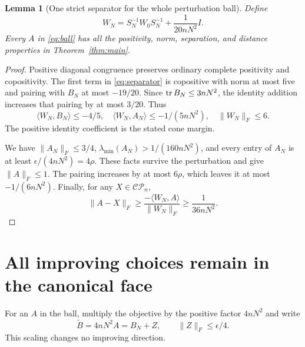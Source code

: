 \documentclass[11pt]{article}
\newtheorem{lemma}[theorem]{Lemma}
\theoremstyle{remark}\newtheorem{remark}[theorem]{Remark}
\newcommand{\CP}{\mathcal{CP}}\newcommand{\COP}{\mathcal{COP}}
\newcommand{\ip}[2]{\langle #1,#2\rangle}\newcommand{\trans}{^{\mathsf T}}
\newcommand{\norm}[1]{\lVert #1\rVert}
\begin{document}
\begin{lemma}[One strict separator for the whole perturbation ball]\label{lem:separator}
Define
\begin{equation}\label{eq:separator}
 W_N=S_N^{-1}W_0S_N^{-1}+\frac1{20nN^2}I.
\end{equation}
Every $A$ in \eqref{eq:ball} has all the positivity, norm, separation, and distance properties in Theorem~\ref{thm:main}.
\end{lemma}
\begin{proof}
Positive diagonal congruence preserves ordinary complete positivity and copositivity. The first term in \eqref{eq:separator} is copositive with norm at most five and pairing with $B_N$ at most $-19/20$. Since $\operatorname{tr} B_N\le3nN^2$, the identity addition increases that pairing by at most $3/20$. Thus
\[
 \ip{W_N}{B_N}\le-4/5,\quad
 \ip{W_N}{A_N}\le-1/(5nN^2),\quad \norm{W_N}_F\le6.
\]
The positive identity coefficient is the stated cone margin.

We have $\norm{A_N}_F\le3/4$, $\lambda_{\min}(A_N)>1/(160nN^2)$, and every entry of $A_N$ is at least $\epsilon/(4nN^2)=4\rho$. These facts survive the perturbation and give $\norm A_F\le1$. The pairing increases by at most $6\rho$, which leaves it at most $-1/(6nN^2)$. Finally, for any $X\in\CP_n$,
\[
 \norm{A-X}_F\ge\frac{-\ip{W_N}A}{\norm{W_N}_F}\ge\frac1{36nN^2}.
\]
\end{proof}

\section{All improving choices remain in the canonical face}
For an $A$ in the ball, multiply the objective by the positive factor $4nN^2$ and write
\[
 \widetilde B=4nN^2A=B_N+Z,\qquad \norm Z_F\le\epsilon/4.
\]
This scaling changes no improving direction.
\end{document}
